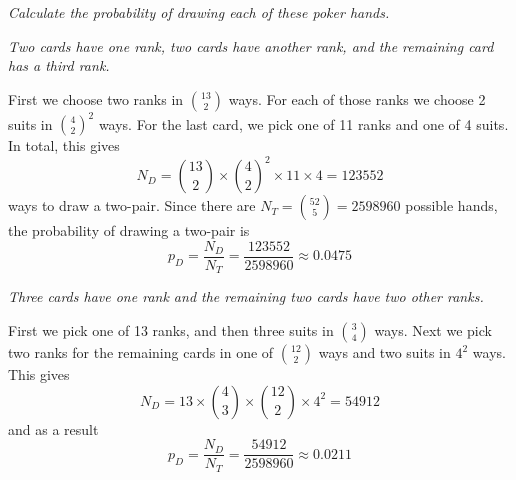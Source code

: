 \documentclass[a4paper,10pt,landscape,twocolumn]{scrartcl}
\begin{document}
\begin{exercise}
  {\itshape   Calculate the probability of drawing each of these poker hands.}
	
  \begin{subex}\itshape
    Two cards have one rank, two cards have another rank, and the remaining
    card has a third rank.
  \end{subex}
  
  \begin{solution}
    First we choose two ranks in ${13 \choose 2}$ ways. For each of those ranks
    we choose 2 suits in ${4 \choose 2}^2$ ways. For the last card, we pick one
    of 11 ranks and one of 4 suits. In total, this gives
    \[  
      N_D 
        = { 13 \choose 2} \times {4 \choose 2}^2 \times 11 \times 4 
        = 123 552
    \]
    ways to draw a two-pair. Since there are $N_T = {52 \choose 5} = 2598960$
    possible hands, the probability of drawing a two-pair is 
    \[
      p_D 
        = \frac{N_D}{N_T} 
        = \frac{123552}{2598960} 
        \approx 0.0475
    \]
  \end{solution}
	

  \begin{subex}\itshape
    Three cards have one rank and the remaining two cards have two other ranks.
  \end{subex}
  
  \begin{solution}
    First we pick one of 13 ranks, and then three suits in ${3 \choose 4}$
    ways. Next we pick two ranks for the remaining cards in one of ${12 \choose
    2}$ ways and two suits in $4^2$ ways. This gives 
    \[
      N_D 
        = 13 \times {4 \choose 3} \times {12 \choose 2} \times 4^2 
        = 54912
    \]
    and as a result
	 \[
      p_D 
        = \frac{N_D}{N_T} 
        = \frac{54912}{2598960} 
        \approx 0.0211
	 \]
  \end{solution}
\end{exercise}
\end{document}
